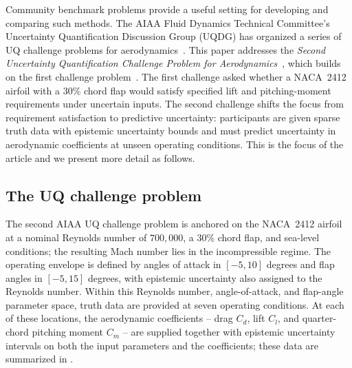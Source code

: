 \documentclass[a4paper,12pt]{article}
\begin{document}
Community benchmark problems provide a useful setting for developing and comparing such methods. The AIAA Fluid Dynamics Technical Committee's Uncertainty Quantification Discussion Group (UQDG) has organized a series of UQ challenge problems for aerodynamics~\cite{Cary2022}. This paper addresses the \emph{Second Uncertainty Quantification Challenge Problem for Aerodynamics}~\cite{cary2026summary}, which builds on the first challenge problem~\cite{cary2024overview}. The first challenge asked whether a NACA~2412 airfoil with a 30\% chord flap would satisfy specified lift and pitching-moment requirements under uncertain inputs. The second challenge shifts the focus from requirement satisfaction to predictive uncertainty: participants are given sparse truth data with epistemic uncertainty bounds and must predict uncertainty in aerodynamic coefficients at unseen operating conditions. This is the focus of the article and we present more detail as follows.

%


\subsection{The UQ challenge problem}
\label{sec:uqchallenge}
The second AIAA UQ challenge problem is anchored on the NACA~2412 airfoil at a nominal Reynolds number of $700{,}000$, a 30\% chord flap, and sea-level conditions; the resulting Mach number lies in the incompressible regime. The operating envelope is defined by angles of attack in $[-5,10]$ degrees and flap angles in $[-5,15]$ degrees, with epistemic uncertainty also assigned to the Reynolds number. Within this Reynolds number, angle-of-attack, and flap-angle parameter space, truth data are provided at seven operating conditions. At each of these locations, the aerodynamic coefficients -- drag $C_d$, lift $C_l$, and quarter-chord pitching moment $C_m$ -- are supplied together with epistemic uncertainty intervals on both the input parameters and the coefficients; these data are summarized in .
\end{document}
